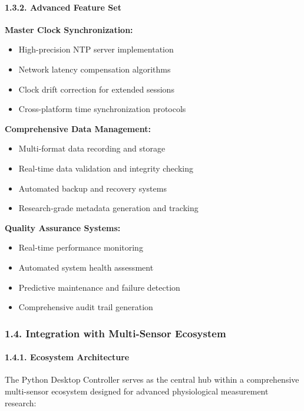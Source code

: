 \documentclass[12pt,a4paper]{article}
\begin{document}
\paragraph{1.3.2. Advanced Feature Set}

\textbf{Master Clock Synchronization:}

\begin{itemize}
\item High-precision NTP server implementation
\item Network latency compensation algorithms
\item Clock drift correction for extended sessions
\item Cross-platform time synchronization protocols

\end{itemize}
\textbf{Comprehensive Data Management:}

\begin{itemize}
\item Multi-format data recording and storage
\item Real-time data validation and integrity checking
\item Automated backup and recovery systems
\item Research-grade metadata generation and tracking

\end{itemize}
\textbf{Quality Assurance Systems:}

\begin{itemize}
\item Real-time performance monitoring
\item Automated system health assessment
\item Predictive maintenance and failure detection
\item Comprehensive audit trail generation

\end{itemize}
\subsubsection{1.4. Integration with Multi-Sensor Ecosystem}

\paragraph{1.4.1. Ecosystem Architecture}

The Python Desktop Controller serves as the central hub within a comprehensive multi-sensor ecosystem designed for
advanced physiological measurement research:
\end{document}
